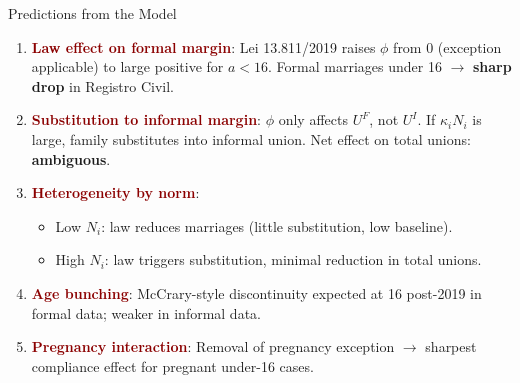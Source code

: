 \documentclass[aspectratio=169,10pt]{beamer}
\newcommand{\hl}[1]{\textcolor{darkred}{\textbf{#1}}}
\begin{document}
\begin{frame}{Predictions from the Model}
    \begin{enumerate}
        \item \hl{Law effect on formal margin}: Lei 13.811/2019 raises $\phi$ from 0 (exception applicable) to large positive for $a<16$. Formal marriages under 16 $\rightarrow$ \textbf{sharp drop} in Registro Civil.
        \item \hl{Substitution to informal margin}: $\phi$ only affects $U^F$, not $U^I$. If $\kappa_i N_i$ is large, family substitutes into informal union. Net effect on total unions: \textbf{ambiguous}.
        \item \hl{Heterogeneity by norm}:
        \begin{itemize}
            \item Low $N_i$: law reduces marriages (little substitution, low baseline).
            \item High $N_i$: law triggers substitution, minimal reduction in total unions.
        \end{itemize}
        \item \hl{Age bunching}: McCrary-style discontinuity expected at 16 post-2019 in formal data; weaker in informal data.
        \item \hl{Pregnancy interaction}: Removal of pregnancy exception $\rightarrow$ sharpest compliance effect for pregnant under-16 cases.
    \end{enumerate}
\end{frame}
\end{document}
